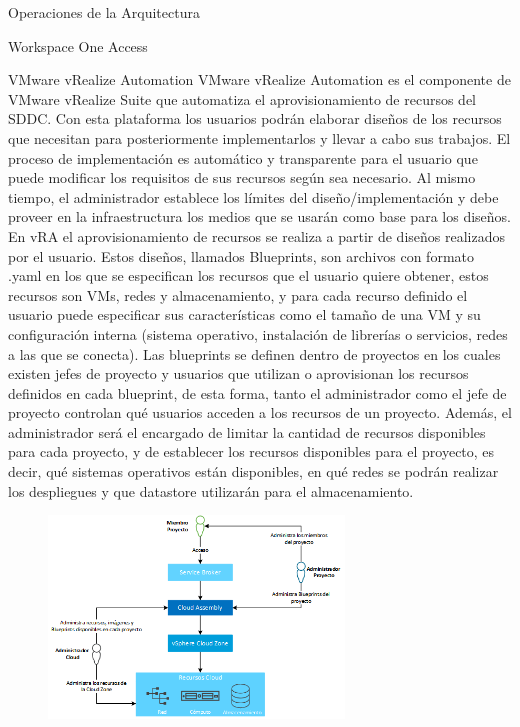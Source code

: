 \begin{subsection}{Operaciones de la Arquitectura}
\begin{subsubsection}{Workspace One Access}

    \end{subsubsection}

    \begin{subsubsection}{VMware vRealize Automation}
        VMware vRealize Automation es el componente de VMware vRealize Suite que automatiza el aprovisionamiento de recursos del SDDC. Con esta plataforma los usuarios podrán elaborar diseños de los recursos que necesitan para posteriormente implementarlos y llevar a cabo sus trabajos. El proceso de implementación es automático y transparente para el usuario que puede modificar los requisitos de sus recursos según sea necesario. Al mismo tiempo, el administrador establece los límites del diseño/implementación y debe proveer en la infraestructura los medios que se usarán como base para los diseños.
        En vRA el aprovisionamiento de recursos se realiza a partir de diseños realizados por el usuario. Estos diseños, llamados Blueprints, son archivos con formato .yaml en los que se especifican los recursos que el usuario quiere obtener, estos recursos son VMs, redes y almacenamiento, y para cada recurso definido el usuario puede especificar sus características como el tamaño de una VM y su configuración interna (sistema operativo, instalación de librerías o servicios, redes a las que se conecta). Las blueprints se definen dentro de proyectos en los cuales existen jefes de proyecto y usuarios que utilizan o aprovisionan los recursos definidos en cada blueprint, de esta forma, tanto el administrador como el jefe de proyecto controlan qué usuarios acceden a los recursos de un proyecto. Además, el administrador será el encargado de limitar la cantidad de recursos disponibles para cada proyecto, y de establecer los recursos disponibles para el proyecto, es decir, qué sistemas operativos están disponibles, en qué redes se podrán realizar los despliegues y que datastore utilizarán para el almacenamiento.
        \begin{figure}[h]
            \centering
            \includegraphics[width=0.7\textwidth]{imaxes/vRealize_pruebaconcepto/ComponentesVRA.png}

\end{figure}
\end{subsubsection}
\end{subsection}
